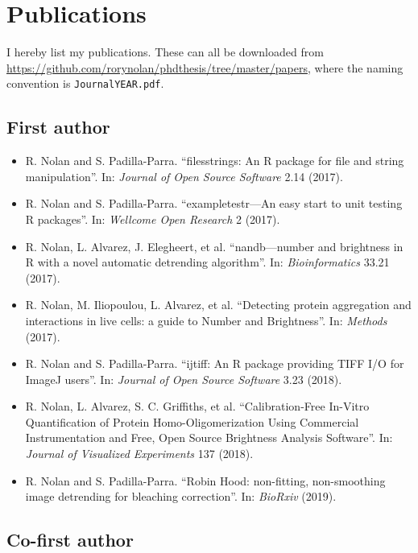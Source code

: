 \documentclass[12pt,]{book}
\providecommand{\tightlist}{%
  \setlength{\itemsep}{0pt}\setlength{\parskip}{0pt}}
\theoremstyle{definition}
\theoremstyle{definition}
\theoremstyle{definition}
\theoremstyle{remark}
\begin{document}
\section*{Publications}\label{publications}

I hereby list my publications. These can all be downloaded from
\url{https://github.com/rorynolan/phdthesis/tree/master/papers}, where
the naming convention is \texttt{JournalYEAR.pdf}.

\subsection*{First author}\label{first-author}

\begin{itemize}
\tightlist
\item
  R. Nolan and S. Padilla-Parra. ``filesstrings: An R package for file
  and string manipulation''. In: \emph{Journal of Open Source Software}
  2.14 (2017).
\item
  R. Nolan and S. Padilla-Parra. ``exampletestr---An easy start to unit
  testing R packages''. In: \emph{Wellcome Open Research} 2 (2017).
\item
  R. Nolan, L. Alvarez, J. Elegheert, et al. ``nandb---number and
  brightness in R with a novel automatic detrending algorithm''. In:
  \emph{Bioinformatics} 33.21 (2017).
\item
  R. Nolan, M. Iliopoulou, L. Alvarez, et al. ``Detecting protein
  aggregation and interactions in live cells: a guide to Number and
  Brightness''. In: \emph{Methods} (2017).
\item
  R. Nolan and S. Padilla-Parra. ``ijtiff: An R package providing TIFF
  I/O for ImageJ users''. In: \emph{Journal of Open Source Software}
  3.23 (2018).
\item
  R. Nolan, L. Alvarez, S. C. Griffiths, et al. ``Calibration-Free
  In-Vitro Quantification of Protein Homo-Oligomerization Using
  Commercial Instrumentation and Free, Open Source Brightness Analysis
  Software''. In: \emph{Journal of Visualized Experiments} 137 (2018).
\item
  R. Nolan and S. Padilla-Parra. ``Robin Hood: non-fitting,
  non-smoothing image detrending for bleaching correction''. In:
  \emph{BioRxiv} (2019).
\end{itemize}

\subsection*{Co-first author}\label{co-first-author}
\end{document}
